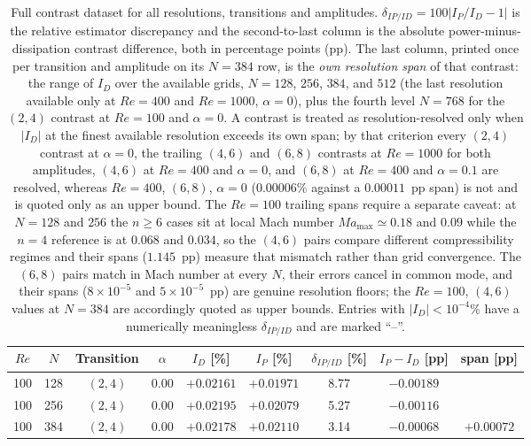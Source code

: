 \begin{table}[!htbp]
\footnotesize
\centering
\renewcommand{\arraystretch}{0.92}
\setlength{\tabcolsep}{3.5pt}
\caption{Full contrast dataset for all resolutions, transitions and amplitudes. $\delta_{IP/ID}=100|I_P/I_D-1|$ is the relative estimator discrepancy and the second-to-last column is the absolute power-minus-dissipation contrast difference, both in percentage points (pp). The last column, printed once per transition and amplitude on its $N=384$ row, is the \emph{own resolution span} of that contrast: the range of $I_D$ over the available grids, $N=128$, $256$, $384$, and $512$ (the last resolution available only at $Re=400$ and $Re=1000$, $\alpha=0$), plus the fourth level $N=768$ for the $(2,4)$ contrast at $Re=100$ and $\alpha=0$. A contrast is treated as resolution-resolved only when $|I_D|$ at the finest available resolution exceeds its own span; by that criterion every $(2,4)$ contrast at $\alpha=0$, the trailing $(4,6)$ and $(6,8)$ contrasts at $Re=1000$ for both amplitudes, $(4,6)$ at $Re=400$ and $\alpha=0$, and $(6,8)$ at $Re=400$ and $\alpha=0.1$ are resolved, whereas $Re=400$, $(6,8)$, $\alpha=0$ ($0.00006\%$ against a $0.00011$~pp span) is not and is quoted only as an upper bound. The $Re=100$ trailing spans require a separate caveat: at $N=128$ and $256$ the $n\ge6$ cases sit at local Mach number $Ma_{\max}\simeq 0.18$ and $0.09$ while the $n=4$ reference is at $0.068$ and $0.034$, so the $(4,6)$ pairs compare different compressibility regimes and their spans ($1.145$~pp) measure that mismatch rather than grid convergence. The $(6,8)$ pairs match in Mach number at every $N$, their errors cancel in common mode, and their spans ($8\times10^{-5}$ and $5\times10^{-5}$~pp) are genuine resolution floors; the $Re=100$, $(4,6)$ values at $N=384$ are accordingly quoted as upper bounds. Entries with $|I_D|<10^{-4}\%$ have a numerically meaningless $\delta_{IP/ID}$ and are marked ``--''.}
\label{supptab:contrasts}
\begin{tabular}{@{}ccccccccc@{}}
\hline
$Re$ & $N$ & Transition & $\alpha$ & $I_D$ [\%] & $I_P$ [\%] & $\delta_{IP/ID}$ [\%] & $I_P-I_D$ [pp] & span [pp] \\
\hline
100  & 128 & $(2,4)$ & 0.00 & $+0.02161$ & $+0.01971$ &  8.77 & $-0.00189$ &  \\
100  & 256 & $(2,4)$ & 0.00 & $+0.02195$ & $+0.02079$ &  5.27 & $-0.00116$ &  \\
100  & 384 & $(2,4)$ & 0.00 & $+0.02178$ & $+0.02110$ &  3.14 & $-0.00068$ & $+0.00072$ \\

\end{tabular}
\end{table}
